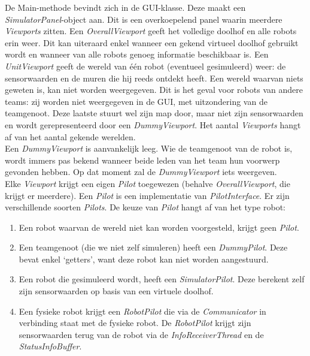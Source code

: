 \documentclass[tt3]{penoverslag}
\begin{document}
De Main-methode bevindt zich in de GUI-klasse. Deze maakt een \textit{SimulatorPanel}-object aan. Dit is een overkoepelend panel waarin meerdere \textit{Viewports} zitten. Een \textit{OverallViewport} geeft het volledige doolhof en alle robots erin weer. Dit kan uiteraard enkel wanneer een gekend virtueel doolhof gebruikt wordt en wanneer van alle robots genoeg informatie beschikbaar is. Een \textit{UnitViewport} geeft de wereld van \'e\'en robot (eventueel gesimuleerd) weer: de sensorwaarden en de muren die hij reeds ontdekt heeft. Een wereld waarvan niets geweten is, kan niet worden weergegeven. Dit is het geval voor robots van andere teams: zij worden niet weergegeven in de GUI, met uitzondering van de teamgenoot. Deze laatste stuurt wel zijn map door, maar niet zijn sensorwaarden en wordt gerepresenteerd door een \textit{DummyViewport}. Het aantal \textit{Viewports} hangt af van het aantal gekende werelden.\\

Een \textit{DummyViewport} is aanvankelijk leeg. Wie de teamgenoot van de robot is, wordt immers pas bekend wanneer beide leden van het team hun voorwerp gevonden hebben. Op dat moment zal de \textit{DummyViewport} iets weergeven.\\

Elke \textit{Viewport} krijgt een eigen \textit{Pilot} toegewezen (behalve \textit{OverallViewport}, die krijgt er meerdere). Een \textit{Pilot} is een implementatie van \textit{PilotInterface}. Er zijn verschillende soorten \textit{Pilots}. De keuze van \textit{Pilot} hangt af van het type robot:

\begin{enumerate}
	\item Een robot waarvan de wereld niet kan worden voorgesteld, krijgt geen \textit{Pilot}.
	\item Een teamgenoot (die we niet zelf simuleren) heeft een \textit{DummyPilot}. Deze bevat enkel `getters', want deze robot kan niet worden aangestuurd.
	\item Een robot die gesimuleerd wordt, heeft een \textit{SimulatorPilot}. Deze berekent zelf zijn sensorwaarden op basis van een virtuele doolhof.
	\item Een fysieke robot krijgt een \textit{RobotPilot} die via de \textit{Communicator} in verbinding staat met de fysieke robot. De \textit{RobotPilot} krijgt zijn sensorwaarden terug van de robot via de \textit{InfoReceiverThread} en de \textit{StatusInfoBuffer}.
\end{enumerate}
\end{document}
